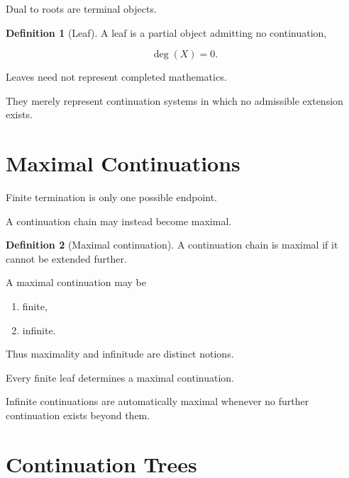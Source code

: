 \documentclass[13pt,openany]{book}
\theoremstyle{plain}
\theoremstyle{definition}
\newtheorem{definition}{Definition}[chapter]
\begin{document}
Dual to roots are terminal objects.

\begin{definition}[Leaf]
A leaf is a partial object admitting no continuation,

\[
\deg(X)=0.
\]
\end{definition}

Leaves need not represent completed mathematics.

They merely represent continuation systems in which no admissible
extension exists.

\section{Maximal Continuations}

Finite termination is only one possible endpoint.

A continuation chain may instead become maximal.

\begin{definition}[Maximal continuation]
A continuation chain is maximal if it cannot be extended further.

A maximal continuation may be

\begin{enumerate}

\item finite,

\item infinite.

\end{enumerate}

\end{definition}

Thus maximality and infinitude are distinct notions.

Every finite leaf determines a maximal continuation.

Infinite continuations are automatically maximal whenever no further
continuation exists beyond them.

\section{Continuation Trees}
\end{document}
